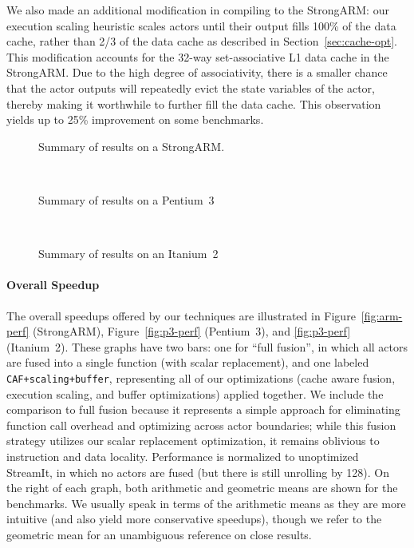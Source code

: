 \documentclass{sigplanconf}
\begin{document}
We also made an additional modification in compiling to the StrongARM:
our execution scaling heuristic scales actors until their output
fills 100\% of the data cache, rather than 2/3 of the data cache as
described in Section~\ref{sec:cache-opt}.  This modification accounts
for the 32-way set-associative L1 data cache in the StrongARM.  Due to
the high degree of associativity, there is a smaller chance that the
actor outputs will repeatedly evict the state variables of the
actor, thereby making it worthwhile to further fill the data cache.
This observation yields up to 25\% improvement on some
benchmarks.

\begin{figure}[t]
\nocaptionrule
\begin{minipage}{3.35in}
\centering
{}
\vspace{-14pt}
\caption{Summary of results on a StrongARM.\protect\label{fig:arm-perf}}
~ \\ \vspace{3pt}

\vspace{-14pt}
\caption{Summary of results on a Pentium~3\protect\label{fig:p3-perf}}
~ \\ \vspace{3pt}

\vspace{-14pt}
\caption{Summary of results on an Itanium~2\protect\label{fig:i2-perf}}
\end{minipage}
\end{figure}

\paragraph*{Overall Speedup} 
The overall speedups offered by our techniques are illustrated in
Figure~\ref{fig:arm-perf} (StrongARM), Figure~\ref{fig:p3-perf}
(Pentium~3), and \ref{fig:p3-perf} (Itanium~2).  These graphs have two
bars: one for ``full fusion'', in which all actors are fused into a
single function (with scalar replacement), and one labeled {\tt
CAF+scaling+buffer}, representing all of our optimizations (cache
aware fusion, execution scaling, and buffer optimizations) applied
together.  We include the comparison to full fusion because it
represents a simple approach for eliminating function call overhead
and optimizing across actor boundaries; while this fusion strategy
utilizes our scalar replacement optimization, it remains oblivious to
instruction and data locality.  Performance is normalized to
unoptimized StreamIt, in which no actors are fused (but there is
still unrolling by 128).  On the right of each graph, both arithmetic
and geometric means are shown for the benchmarks.  We usually speak in
terms of the arithmetic means as they are more intuitive (and also
yield more conservative speedups), though we refer to the geometric
mean for an unambiguous reference on close results.
\end{document}
